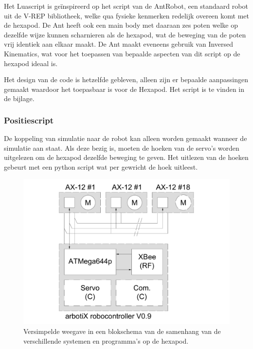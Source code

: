 \documentclass[10pt,a4paper]{article}
\begin{document}
Het Luascript is geïnspireerd op het script van de AntRobot, een standaard robot uit de V-REP bibliotheek, welke qua fysieke kenmerken redelijk overeen komt met de hexapod. De Ant heeft ook een main body met daaraan zes poten welke op dezelfde wijze kunnen scharnieren als de hexapod, wat de beweging van de poten vrij identiek aan elkaar maakt. De Ant maakt eveneens gebruik van Inversed Kinematics, wat voor het toepassen van bepaalde aspecten van dit script op de hexapod ideaal is.

Het design van de code is hetzelfde gebleven, alleen zijn er bepaalde aanpassingen gemaakt waardoor het toepasbaar is voor de Hexapod. Het script is te vinden in de bijlage.

\subsubsection{Positiescript}

De koppeling van simulatie naar de robot kan alleen worden gemaakt wanneer de simulatie aan staat. Als deze bezig is, moeten de hoeken van de servo's worden uitgelezen om de hexapod dezelfde beweging te geven. Het uitlezen van de hoeken gebeurt met een python script wat per gewricht de hoek uitleest.


\begin{figure}[h]
    \centering
    \includegraphics[width=1\textwidth]{blockschematic-spider}
    \caption{Versimpelde weegave in een blokschema van de samenhang van de verschillende systemen en programma's op de hexapod.}
    \label{fig:blockschematic-spider}
\end{figure}
\end{document}
